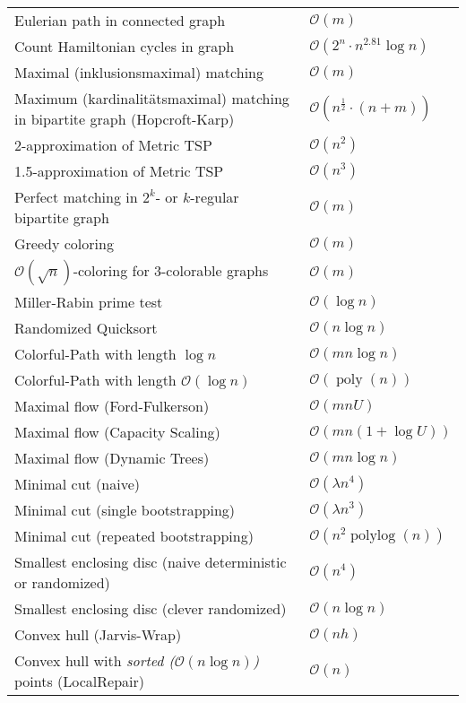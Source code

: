\documentclass[a4paper,10pt]{article}
\newcommand{\bigO}{\mathcal{O}}
\DeclareMathOperator{\poly}{poly}
\DeclareMathOperator{\polylog}{polylog}
\begin{document}
    \begin{center}
    \begin{tabularx}{\textwidth}{Xl}
        \toprule
        Eulerian path in connected graph & \(\bigO(m)\) \\
        Count Hamiltonian cycles in graph & \(\bigO(2^n \cdot n^{2.81} \log n)\) \\
        Maximal (inklusionsmaximal) matching & \(\bigO(m)\) \\
        Maximum (kardinalitätsmaximal) matching in bipartite graph (Hopcroft-Karp) & \(\bigO(n^\frac{1}{2} \cdot (n+m))\) \\
        2-approximation of Metric TSP & \(\bigO(n^2)\) \\
        1.5-approximation of Metric TSP & \(\bigO(n^3)\) \\
        Perfect matching in \(2^k\)- or $k$-regular bipartite graph & \(\bigO(m)\) \\
        Greedy coloring & \(\bigO(m)\) \\
        \(\bigO(\sqrt{n})\)-coloring for 3-colorable graphs & \(\bigO(m)\) \\
        Miller-Rabin prime test & \(\bigO(\log n)\) \\
        Randomized Quicksort & \(\bigO(n \log n)\)\footnotemark \\
        Colorful-Path with length \(\log n\) & \(\bigO(mn \log n)\) \\
        Colorful-Path with length \(\bigO(\log n)\) & \(\bigO(\poly(n))\) \\
        Maximal flow (Ford-Fulkerson) & \(\bigO(mnU)\)\\
        Maximal flow (Capacity Scaling) & \(\bigO(mn(1 + \log U))\) \\
        Maximal flow (Dynamic Trees) & \(\bigO(mn\log n)\) \\
        Minimal cut (naive) & \(\bigO(\lambda n^4)\) \\
        Minimal cut (single bootstrapping) & \(\bigO(\lambda n^3)\) \\
        Minimal cut (repeated bootstrapping) & \(\bigO(n^2\polylog(n))\) \\
        Smallest enclosing disc (naive deterministic or randomized) & \(\bigO(n^4)\)\footnotemark[\value{footnote}] \\
        Smallest enclosing disc (clever randomized) & \(\bigO(n \log n)\)\footnotemark[\value{footnote}] \\
        Convex hull (Jarvis-Wrap) & \(\bigO(nh)\) \\
        Convex hull with \emph{sorted ($\bigO(n \log n)$)} points (LocalRepair) & \(\bigO(n)\) \\
        \bottomrule
    \end{tabularx}
    \end{center}
\end{document}
